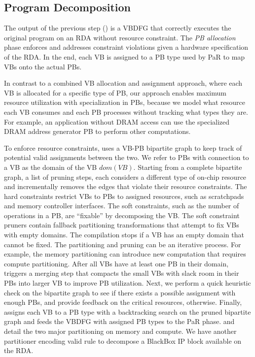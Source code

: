 \subsection{Program Decomposition} \label{sec:decompose}
The output of the previous step () is a VBDFG that correctly executes the original program on an RDA without resource constraint. 
The {\em PB allocation} phase enforces and addresses constraint violations given a hardware specification of the RDA. 
In the end, each VB is assigned to a PB type used by PaR to map VBs onto the actual PBs.

In contrast to a combined VB allocation and assignment approach, where each VB is allocated for a specific type of PB, our approach enables maximum resource utilization with specialization in PBs, because we model what resource each VB consumes and each PB processes without tracking what types they are.
For example, an application without DRAM access can use the specialized DRAM address generator PB to perform other computations.

To enforce resource constraints, \name{} uses a VB-PB bipartite graph to keep track of potential valid assignments between the two.
We refer to PBs with connection to a VB as the domain of the VB $dom(VB)$.
Starting from a complete bipartite graph, a list of pruning steps, each considers a different type of on-chip resource and incrementally removes the edges that violate their resource constraints.
The hard constraints restrict VBs to PBs to assigned resources, such as scratchpads and memory controller interfaces.
The soft constraints, such as the number of operations in a PB, are ``fixable'' by decomposing the VB.
The soft constraint pruners contain fallback partitioning transformations that attempt to fix VBs with empty domains.
The compilation stops if a VB has an empty domain that cannot be fixed.
The partitioning and pruning can be an iterative process. 
For example, the memory partitioning can introduce new computation that requires compute partitioning.
After all VBs have at least one PB in their domain, \name{} triggers a merging step that compacts the small VBs with slack room in their PBs into larger VB to improve PB utilization.
Next, we perform a quick heuristic check on the bipartite graph to see if there exists a possible assignment with enough PBs, and provide feedback on the critical resources, otherwise.
Finally, \name{} assigns each VB to a PB type with a backtracking search on the pruned bipartite graph and feeds the VBDFG with assigned PB types to the PaR phase.
 and  detail the two major partitioning on memory and compute.
We have another partitioner encoding valid rule to decompose a BlackBox IP block available on the RDA.


